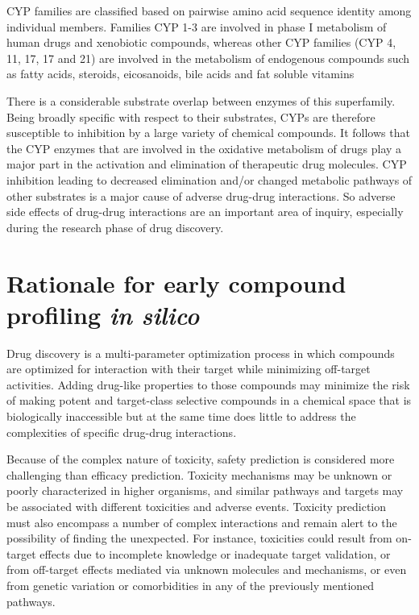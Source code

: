 CYP families are classified based on pairwise amino acid sequence identity among individual members. Families CYP 1-3 are involved in phase I metabolism of human drugs and xenobiotic compounds, whereas other CYP families (CYP 4, 11, 17, 17 and 21) are involved in the metabolism of endogenous compounds such as fatty acids, steroids, eicosanoids, bile acids and fat soluble vitamins\cite{Singh2011}

There is a considerable substrate overlap between enzymes of this superfamily. Being broadly specific with respect to their substrates, CYPs are therefore susceptible to inhibition by a large variety of chemical compounds. It follows that the CYP enzymes that are involved in the oxidative metabolism of drugs play a major part in the activation and elimination of therapeutic drug molecules. CYP inhibition leading to decreased elimination and/or changed metabolic pathways of other substrates is a major cause of adverse drug-drug interactions. \cite{Lapins2013} So adverse side effects of drug-drug interactions are an important area of inquiry, especially during the research phase of drug discovery.


\section{Rationale for early compound profiling \textit{in silico}}

Drug discovery is a multi-parameter optimization process in which compounds are optimized for interaction with their target while minimizing off-target activities. \cite{Zlokarnik2005} Adding drug-like properties to those compounds may minimize the risk of making potent and target-class selective compounds in a chemical space that is biologically inaccessible but at the same time does little to address the complexities of specific drug-drug interactions.


Because of the complex nature of toxicity, safety prediction is considered more challenging than efficacy prediction. Toxicity mechanisms may be unknown or poorly characterized in higher organisms, and similar pathways and targets may be associated with different toxicities and adverse events. Toxicity prediction must also encompass a number of complex interactions and remain alert to the possibility of finding the unexpected. For instance, toxicities could result from on-target effects due to incomplete knowledge or inadequate target validation, or from off-target effects mediated via unknown molecules and mechanisms, or even from genetic variation or comorbidities in any of the previously mentioned pathways. \cite{Kruhlak2012}

